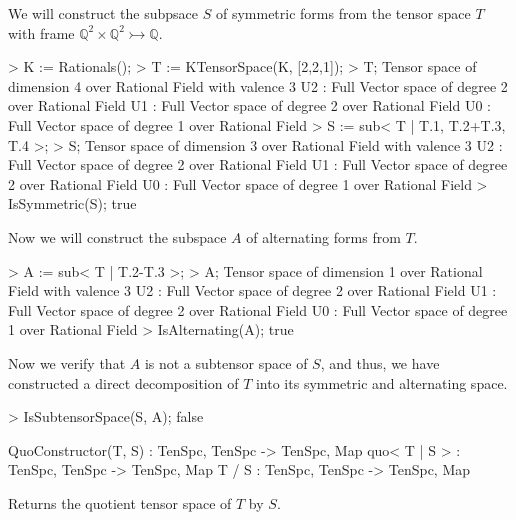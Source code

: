 \begin{example}[SubtensorSpaces]

We will construct the subpsace $S$ of symmetric forms from the tensor space $T$ with frame $\mathbb{Q}^2\times\mathbb{Q}^2\rightarrowtail \mathbb{Q}$.
\begin{code}
> K := Rationals();
> T := KTensorSpace(K, [2,2,1]);
> T;
Tensor space of dimension 4 over Rational Field with valence 3
U2 : Full Vector space of degree 2 over Rational Field
U1 : Full Vector space of degree 2 over Rational Field
U0 : Full Vector space of degree 1 over Rational Field
> S := sub< T | T.1, T.2+T.3, T.4 >;
> S;
Tensor space of dimension 3 over Rational Field with valence 3
U2 : Full Vector space of degree 2 over Rational Field
U1 : Full Vector space of degree 2 over Rational Field
U0 : Full Vector space of degree 1 over Rational Field
> IsSymmetric(S);
true
\end{code}

Now we will construct the subspace $A$ of alternating forms from $T$.
\begin{code}
> A := sub< T | T.2-T.3 >;
> A;
Tensor space of dimension 1 over Rational Field with valence 3
U2 : Full Vector space of degree 2 over Rational Field
U1 : Full Vector space of degree 2 over Rational Field
U0 : Full Vector space of degree 1 over Rational Field
> IsAlternating(A);
true
\end{code}

Now we verify that $A$ is not a subtensor space of $S$, and thus, we have constructed a direct decomposition of $T$ into its symmetric and alternating space.
\begin{code}
> IsSubtensorSpace(S, A);
false
\end{code}
\end{example}

\begin{intrinsics}
QuoConstructor(T, S) : TenSpc, TenSpc -> TenSpc, Map
quo< T | S > : TenSpc, TenSpc -> TenSpc, Map
T / S : TenSpc, TenSpc -> TenSpc, Map
\end{intrinsics}

Returns the quotient tensor space of $T$ by $S$.

